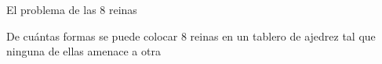 \documentclass[handout]{beamer}
\begin{document}
\begin{frame}{El problema de las 8 reinas}
  \begin{definition}
    De cu\'antas formas se puede colocar 8 reinas en un tablero de ajedrez tal que ninguna de ellas amenace a otra
  \end{definition}
\end{frame}

\begin{frame}
\end{frame}
\end{document}
